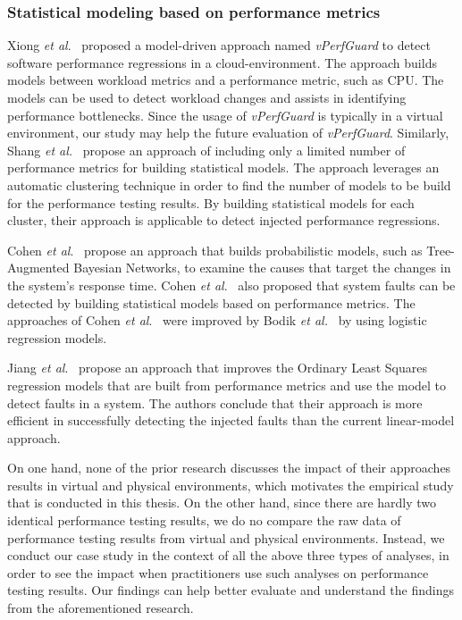 \subsubsection{Statistical modeling based on performance metrics}
\label{sec:relatedmodel}

Xiong \textit{et al$.$}~\cite{xiong2013vperfguard} proposed a model-driven approach named \textit{vPerfGuard} to detect software performance regressions in a cloud-environment. The approach builds models between workload metrics and a performance metric, such as CPU. The models can be used to detect workload changes and assists in identifying performance bottlenecks. Since the usage of \emph{vPerfGuard} is typically in a virtual environment, our study may help the future evaluation of \textit{vPerfGuard}. Similarly, Shang \textit{ et al.}~\cite{Shang:2015:ADP:2668930.2688052} propose an approach of including only a limited number of performance metrics for building statistical models. The approach leverages an automatic clustering technique in order to find the number of models to be build for the performance testing results. By building statistical models for each cluster, their approach is applicable to detect injected performance regressions. 

Cohen \textit{et al$.$}~\cite{cohen2004correlating} propose an approach that builds probabilistic models, such as Tree-Augmented Bayesian Networks, to examine the causes that target the changes in the system's response time. Cohen \textit{et al$.$}~\cite{Cohen:2005:CIC:1095810.1095821} also proposed that system faults can be detected by building statistical models based on performance metrics. The approaches of Cohen \textit{et al$.$}~\cite{cohen2004correlating, Cohen:2005:CIC:1095810.1095821} were improved by Bodik \textit{et al.}~\cite{bodik2008hilighter} by using logistic regression models.

Jiang \emph{et al$.$}~\cite{Jiang:2009:SMM:1555228.1555233} propose an approach that improves the Ordinary Least Squares regression models that are built from performance metrics and use the model to detect faults in a system. The authors conclude that their approach is more efficient in successfully detecting the injected faults than the current linear-model approach.

On one hand, none of the prior research discusses the impact of their approaches results in virtual and physical environments, which motivates the empirical study that is conducted in this thesis. On the other hand, since there are hardly two identical performance testing results, we do no compare the raw data of performance testing results from virtual and physical environments. Instead, we conduct our case study in the context of all the above three types of analyses, in order to see the impact when practitioners use such analyses on performance testing results. Our findings can help better evaluate and understand the findings from the aforementioned research. 



